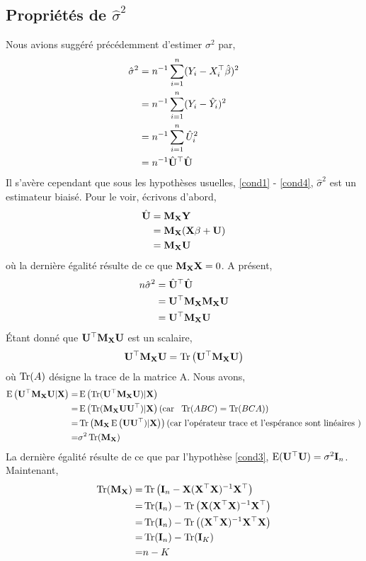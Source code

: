 \subsection{Propriétés de $\hat{\sigma}^2$}
Nous avions suggéré précédemment d'estimer $\sigma^2$ par,
\begin{align*}
\hat{\sigma}^2 &= n^{-1}\sum_{i=1}^n (Y_i-X_i^\top\hat{\beta})^2\\
&= n^{-1}\sum_{i=1}^n (Y_i-\hat{Y}_i)^2\\
&= n^{-1}\sum_{i=1}^n \hat{U}_i^2\\
& =  n^{-1}\hat{\mathbf U}^\top\hat{\mathbf U}
\end{align*}
Il s'avère cependant que sous les hypothèses usuelles, \eqref{cond1} - \eqref{cond4}, $\hat{\sigma}^2$ est un estimateur biaisé. Pour le voir, écrivons d'abord,
\begin{align*}
\hat{\mathbf U} &= \mathbf M_\mathbf X\mathbf Y\\
& = \mathbf M_\mathbf X(\mathbf X\beta + \mathbf U)\\
& = \mathbf M_\mathbf X\mathbf U
\end{align*}
où la dernière égalité résulte de ce que $\mathbf M_\mathbf X\mathbf X = 0$. A présent,
\begin{align*}
n\hat{\sigma}^2 &= \hat{\mathbf U}^\top\hat{\mathbf U}\\
& = \mathbf U^\top\mathbf M_\mathbf X\mathbf M_\mathbf X\mathbf U \\
&= \mathbf U^\top\mathbf M_\mathbf X\mathbf U
\end{align*}
\'Etant donné que $\mathbf U^\top\mathbf M_\mathbf X\mathbf U$ est un scalaire,
\begin{align*}
\mathbf U^\top\mathbf M_\mathbf X\mathbf U = \operatorname{Tr}\left(\mathbf U^\top\mathbf M_\mathbf X\mathbf U\right)
\end{align*}
où $\operatorname{Tr}(A)$ désigne la trace de la matrice A. Nous avons,
\begin{align*}
\operatorname{E}\left(\mathbf U^\top\mathbf M_\mathbf X\mathbf U|\mathbf X\right) =&  \operatorname{E}\left(\operatorname{Tr}(\mathbf U^\top\mathbf M_\mathbf X\mathbf U)|\mathbf X\right)\\
=&\operatorname{E}\left(\operatorname{Tr}(\mathbf M_\mathbf X\mathbf U\mathbf U^\top)|\mathbf X\right)(\textrm{car \ } \operatorname{Tr}(ABC) = \operatorname{Tr}(BCA))\\
=&\operatorname{Tr}\left(\mathbf M_\mathbf X\operatorname{E}\left(\mathbf U\mathbf U^\top)|\mathbf X\right)\right)(\textrm{car l'opérateur trace et l'espérance sont linéaires })\\
=&\sigma^2\operatorname{Tr}(\mathbf M_\mathbf X)
\end{align*}
La dernière égalité résulte de ce que par l'hypothèse \eqref{cond3}, $\operatorname{E}(\mathbf U^\top\mathbf U) = \sigma^2\mathbf{I}_n$. Maintenant,
\begin{align*}
\operatorname{Tr}(\mathbf M_\mathbf X) = &\operatorname{Tr}\left(\mathbf{I}_n - \mathbf X(\mathbf X^\top\mathbf X)^{-1}\mathbf X^\top\right)\\
=&\operatorname{Tr}(\mathbf{I}_n) - \operatorname{Tr}\left(
\mathbf X(\mathbf X^\top\mathbf X)^{-1}\mathbf X^\top\right)\\
=&\operatorname{Tr}(\mathbf{I}_n) - \operatorname{Tr}\left((\mathbf X^\top\mathbf X)^{-1}\mathbf X^\top\mathbf X\right)\\
=&\operatorname{Tr}(\mathbf{I}_n) - \operatorname{Tr}(\mathbf{I}_K)\\
=&n-K
\end{align*}
